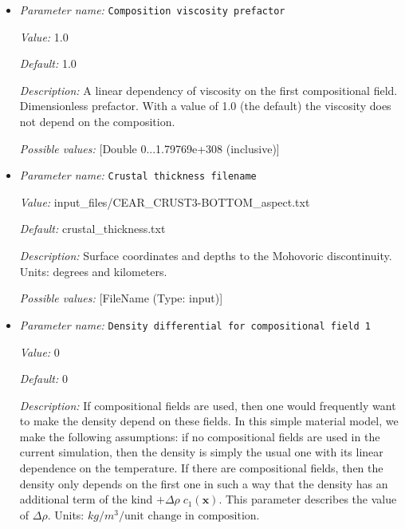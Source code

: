 \begin{itemize}
\item {\it Parameter name:} {\tt Composition viscosity prefactor}
\label{parameters:Material model/Stamps model/Composition viscosity prefactor}


{\it Value:} 1.0


{\it Default:} 1.0


{\it Description:} A linear dependency of viscosity on the first compositional field. Dimensionless prefactor. With a value of 1.0 (the default) the viscosity does not depend on the composition.


{\it Possible values:} [Double 0...1.79769e+308 (inclusive)]
\item {\it Parameter name:} {\tt Crustal thickness filename}
\label{parameters:Material model/Stamps model/Crustal thickness filename}


{\it Value:} input_files/CEAR_CRUST3-BOTTOM_aspect.txt


{\it Default:} crustal_thickness.txt


{\it Description:} Surface coordinates and depths to the Mohovoric discontinuity. Units: degrees and kilometers.


{\it Possible values:} [FileName (Type: input)]
\item {\it Parameter name:} {\tt Density differential for compositional field 1}
\label{parameters:Material model/Stamps model/Density differential for compositional field 1}


{\it Value:} 0


{\it Default:} 0


{\it Description:} If compositional fields are used, then one would frequently want to make the density depend on these fields. In this simple material model, we make the following assumptions: if no compositional fields are used in the current simulation, then the density is simply the usual one with its linear dependence on the temperature. If there are compositional fields, then the density only depends on the first one in such a way that the density has an additional term of the kind $+\Delta \rho \; c_1(\mathbf x)$. This parameter describes the value of $\Delta \rho$. Units: $kg/m^3/\textrm{unit change in composition}$.



\end{itemize}
